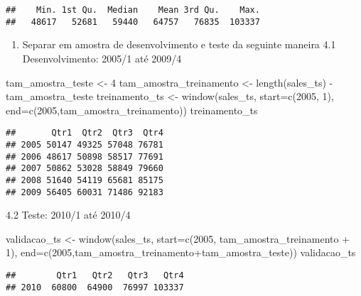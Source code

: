 \documentclass[
]{article}
\newenvironment{Shaded}{\begin{snugshade}}{\end{snugshade}}
\newcommand{\AttributeTok}[1]{\textcolor[rgb]{0.77,0.63,0.00}{#1}}
\newcommand{\DecValTok}[1]{\textcolor[rgb]{0.00,0.00,0.81}{#1}}
\newcommand{\FunctionTok}[1]{\textcolor[rgb]{0.00,0.00,0.00}{#1}}
\newcommand{\NormalTok}[1]{#1}
\newcommand{\OtherTok}[1]{\textcolor[rgb]{0.56,0.35,0.01}{#1}}
\newcommand{\SpecialCharTok}[1]{\textcolor[rgb]{0.00,0.00,0.00}{#1}}
\providecommand{\tightlist}{%
  \setlength{\itemsep}{0pt}\setlength{\parskip}{0pt}}
\begin{document}
\begin{verbatim}
##    Min. 1st Qu.  Median    Mean 3rd Qu.    Max. 
##   48617   52681   59440   64757   76835  103337
\end{verbatim}

\begin{enumerate}
\def\labelenumi{\arabic{enumi}.}
\setcounter{enumi}{3}
\tightlist
\item
  Separar em amostra de desenvolvimento e teste da seguinte maneira 4.1
  Desenvolvimento: 2005/1 até 2009/4
\end{enumerate}

\begin{Shaded}
\begin{Highlighting}[]
\NormalTok{tam\_amostra\_teste }\OtherTok{\textless{}{-}} \DecValTok{4}
\NormalTok{tam\_amostra\_treinamento }\OtherTok{\textless{}{-}} \FunctionTok{length}\NormalTok{(sales\_ts) }\SpecialCharTok{{-}}\NormalTok{ tam\_amostra\_teste}
\NormalTok{treinamento\_ts }\OtherTok{\textless{}{-}} \FunctionTok{window}\NormalTok{(sales\_ts, }\AttributeTok{start=}\FunctionTok{c}\NormalTok{(}\DecValTok{2005}\NormalTok{, }\DecValTok{1}\NormalTok{), }\AttributeTok{end=}\FunctionTok{c}\NormalTok{(}\DecValTok{2005}\NormalTok{,tam\_amostra\_treinamento))}
\NormalTok{treinamento\_ts}
\end{Highlighting}
\end{Shaded}

\begin{verbatim}
##       Qtr1  Qtr2  Qtr3  Qtr4
## 2005 50147 49325 57048 76781
## 2006 48617 50898 58517 77691
## 2007 50862 53028 58849 79660
## 2008 51640 54119 65681 85175
## 2009 56405 60031 71486 92183
\end{verbatim}

4.2 Teste: 2010/1 até 2010/4

\begin{Shaded}
\begin{Highlighting}[]
\NormalTok{validacao\_ts }\OtherTok{\textless{}{-}} \FunctionTok{window}\NormalTok{(sales\_ts, }\AttributeTok{start=}\FunctionTok{c}\NormalTok{(}\DecValTok{2005}\NormalTok{, tam\_amostra\_treinamento }\SpecialCharTok{+} \DecValTok{1}\NormalTok{), }\AttributeTok{end=}\FunctionTok{c}\NormalTok{(}\DecValTok{2005}\NormalTok{,tam\_amostra\_treinamento}\SpecialCharTok{+}\NormalTok{tam\_amostra\_teste))}
\NormalTok{validacao\_ts}
\end{Highlighting}
\end{Shaded}

\begin{verbatim}
##        Qtr1   Qtr2   Qtr3   Qtr4
## 2010  60800  64900  76997 103337
\end{verbatim}
\end{document}
